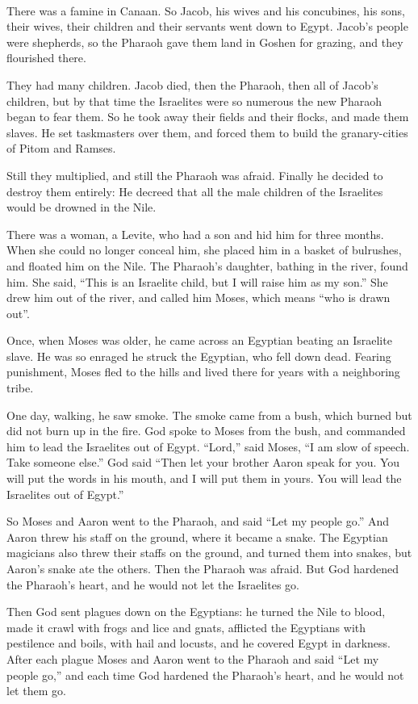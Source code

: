 \documentclass[letter,11pt,openany]{memoir}
\newenvironment{HgEnglish}{\strut\\
\noindent}{\vspace{1em}}
\begin{document}
\vfill
\begin{HgEnglish}
	\small There was a famine in Canaan. So Jacob, his wives and his concubines, his sons, their wives, their children and their servants went down to Egypt. Jacob's people were shepherds, so the Pharaoh gave them land in Goshen for grazing, and they flourished there.
	
	They had many children. Jacob died, then the Pharaoh, then all of Jacob's children, but by that time the Israelites were so numerous the new Pharaoh began to fear them. So he took away their fields and their flocks, and made them slaves. He set taskmasters over them, and forced them to build the granary-cities of Pitom and Ramses.
	
	Still they multiplied, and still the Pharaoh was afraid. Finally he decided to destroy them entirely: He decreed that all the male children of the Israelites would be drowned in the Nile.
	
	There was a woman, a Levite, who had a son and hid him for three months. When she could no longer conceal him, she placed him in a basket of bulrushes, and floated him on the Nile. The Pharaoh's daughter, bathing in the river, found him. She said, ``This is an Israelite child, but I will raise him as my son.'' She drew him out of the river, and called him Moses, which means ``who is drawn out''.
	
	Once, when Moses was older, he came across an Egyptian beating an Israelite slave. He was so enraged he struck the Egyptian, who fell down dead. Fearing punishment, Moses fled to the hills and lived there for years with a neighboring tribe.
	
	One day, walking, he saw smoke. The smoke came from a bush, which burned but did not burn up in the fire. God spoke to Moses from the bush, and commanded him to lead the Israelites out of Egypt. ``Lord,'' said Moses, ``I am slow of speech. Take someone else.'' God said ``Then let your brother Aaron speak for you. You will put the words in his mouth, and I will put them in yours. You will lead the Israelites out of Egypt.''
	
	So Moses and Aaron went to the Pharaoh, and said ``Let my people go.'' And Aaron threw his staff on the ground, where it became a snake. The Egyptian magicians also threw their staffs on the ground, and turned them into snakes, but Aaron's snake ate the others. Then the Pharaoh was afraid. But God hardened the Pharaoh's heart, and he would not let the Israelites go.
	
	Then God sent plagues down on the Egyptians: he turned the Nile to blood, made it crawl with frogs and lice and gnats, afflicted the Egyptians with pestilence and boils, with hail and locusts, and he covered Egypt in darkness. After each plague Moses and Aaron went to the Pharaoh and said ``Let my people go,'' and each time God hardened the Pharaoh's heart, and he would not let them go.
	

\end{HgEnglish}
\end{document}
